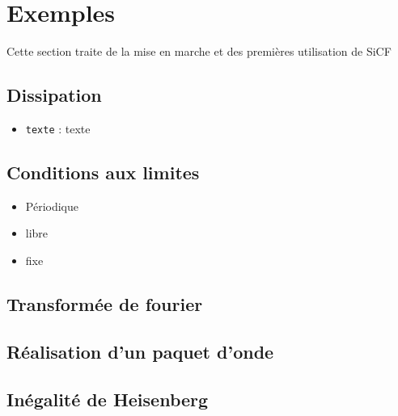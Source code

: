 
\section{Exemples}

Cette section traite de la mise en marche et des premières utilisation de SiCF

\subsection{Dissipation}
\begin{itemize}[label=, leftmargin=2cm]
\item \texttt{texte} : texte
\end{itemize}
%
\subsection{Conditions aux limites}
\begin{itemize}[label=, leftmargin=2cm]
\item Périodique
\item libre
\item fixe
\end{itemize}
%
\subsection{Transformée de fourier}
%
\subsection{Réalisation d'un paquet d'onde}
%
\subsection{Inégalité de Heisenberg}
%
\subsection{}



